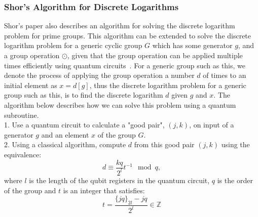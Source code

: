 \subsubsection{Shor's Algorithm for Discrete Logarithms}
Shor's paper also describes an algorithm for solving the discrete logarithm problem for prime groups. This algorithm can be extended to solve the discrete logarithm problem for a generic cyclic group $G$ which has some generator $g$, and a group operation $\odot$, given that the group operation can be applied multiple times efficiently using quantum circuits~\cite{ekeraa2016modifying}. For a generic group such as this, we denote the process of applying the group operation a number $d$ of times to an initial element as $x = d[g]$, thus the discrete logarithm problem for a generic group such as this, is to find the discrete logarithm $d$ given $g$ and $x$. The algorithm below describes how we can solve this problem using a quantum subroutine.\\
1. Use a quantum circuit to calculate a "good pair", $(j,k)$, on input of a generator $g$ and an element $x$ of the group $G$.\\
2. Using a classical algorithm, compute $d$ from this good pair $(j,k)$ using the equivalence:
$$d \equiv \frac{kq}{2^l}t^{-1}\mod q,$$ where $l$ is the length of the qubit registers in the quantum circuit, $q$ is the order of the group and $t$ is an integer that satisfies:
$$t = \frac{\{jq\}_{2l}-jq}{2^l}\in \mathbb{Z}$$
